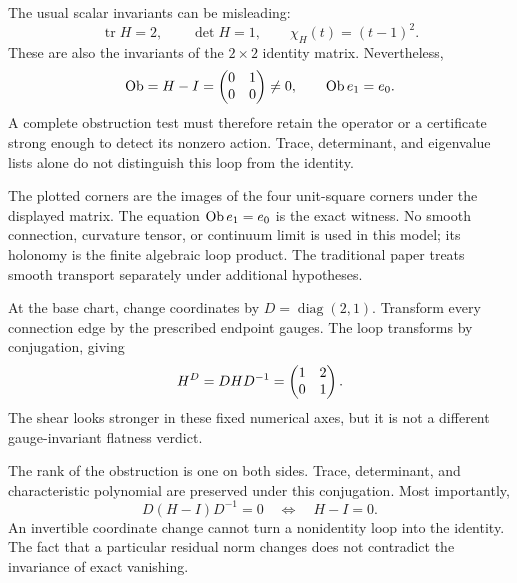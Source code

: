 
The usual scalar invariants can be misleading:
\[
\operatorname{tr}H=2,\qquad \det H=1,\qquad
\chi_H(t)=(t-1)^2.
\]
These are also the invariants of the $2\times2$ identity matrix. Nevertheless,
\[
\operatorname{Ob}=H-I=\begin{pmatrix}0&1\\0&0\end{pmatrix}\ne0,
\qquad \operatorname{Ob} e_1=e_0.
\]
A complete obstruction test must therefore retain the operator or a certificate strong enough to detect its nonzero action. Trace, determinant, and eigenvalue lists alone do not distinguish this loop from the identity.

The plotted corners are the images of the four unit-square corners under the displayed matrix. The equation $\operatorname{Ob} e_1=e_0$ is the exact witness. No smooth connection, curvature tensor, or continuum limit is used in this model; its holonomy is the finite algebraic loop product. The traditional paper treats smooth transport separately under additional hypotheses.


At the base chart, change coordinates by $D=\operatorname{diag}(2,1)$. Transform every connection edge by the prescribed endpoint gauges. The loop transforms by conjugation, giving
\[
H^D=DHD^{-1}=\begin{pmatrix}1&2\\0&1\end{pmatrix}.
\]
The shear looks stronger in these fixed numerical axes, but it is not a different gauge-invariant flatness verdict.


The rank of the obstruction is one on both sides. Trace, determinant, and characteristic polynomial are preserved under this conjugation. Most importantly,
\[
D(H-I)D^{-1}=0\quad\Longleftrightarrow\quad H-I=0.
\]
An invertible coordinate change cannot turn a nonidentity loop into the identity. The fact that a particular residual norm changes does not contradict the invariance of exact vanishing.


